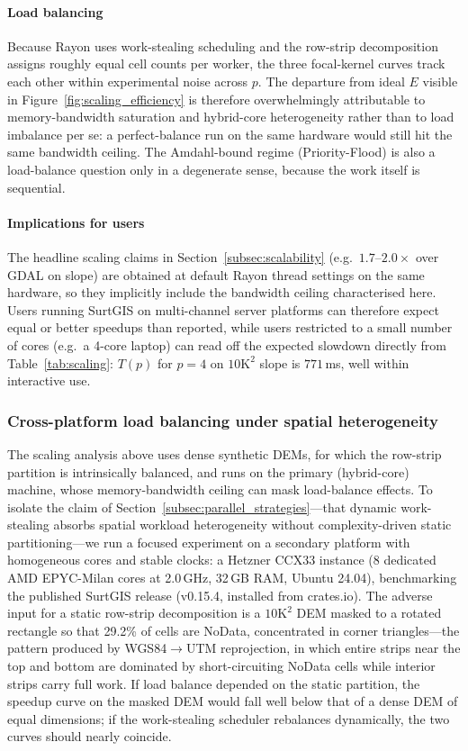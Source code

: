 \documentclass[preprint,review,12pt,authoryear]{elsarticle}
\newif\ifmarkedrev
\newcommand{\revtext}[1]{\ifmarkedrev\textcolor{blue}{#1}\else#1\fi}
\begin{document}
\paragraph{Load balancing} Because Rayon uses work-stealing scheduling \citep{blumofe1999} and the row-strip decomposition assigns roughly equal cell counts per worker, the three focal-kernel curves track each other within experimental noise across $p$. The departure from ideal $E$ visible in Figure~\ref{fig:scaling_efficiency} is therefore overwhelmingly attributable to memory-bandwidth saturation and hybrid-core heterogeneity rather than to load imbalance per se: a perfect-balance run on the same hardware would still hit the same bandwidth ceiling. The Amdahl-bound regime (Priority-Flood) is also a load-balance question only in a degenerate sense, because the work itself is sequential.

\paragraph{Implications for users} The headline scaling claims in Section~\ref{subsec:scalability} (e.g.\ $1.7$--$2.0\times$ over GDAL on slope) are obtained at default Rayon thread settings on the same hardware, so they implicitly include the bandwidth ceiling characterised here. Users running SurtGIS on multi-channel server platforms can therefore expect equal or better speedups than reported, while users restricted to a small number of cores (e.g.\ a 4-core laptop) can read off the expected slowdown directly from Table~\ref{tab:scaling}: $T(p)$ for $p=4$ on $10\text{K}^2$ slope is $771$\,ms, well within interactive use.

\subsubsection{\revtext{Cross-platform load balancing under spatial heterogeneity}}
\label{subsec:nodata_heterogeneity}

\revtext{The scaling analysis above uses dense synthetic DEMs, for which the row-strip partition is intrinsically balanced, and runs on the primary (hybrid-core) machine, whose memory-bandwidth ceiling can mask load-balance effects. To isolate the claim of Section~\ref{subsec:parallel_strategies}---that dynamic work-stealing absorbs spatial workload heterogeneity without complexity-driven static partitioning---we run a focused experiment on a secondary platform with homogeneous cores and stable clocks: a Hetzner CCX33 instance (8 dedicated AMD EPYC-Milan cores at 2.0\,GHz, 32\,GB RAM, Ubuntu 24.04), benchmarking the published SurtGIS release (v0.15.4, installed from crates.io). The adverse input for a static row-strip decomposition is a $10\text{K}^2$ DEM masked to a rotated rectangle so that 29.2\% of cells are NoData, concentrated in corner triangles---the pattern produced by WGS84$\rightarrow$UTM reprojection, in which entire strips near the top and bottom are dominated by short-circuiting NoData cells while interior strips carry full work. If load balance depended on the static partition, the speedup curve on the masked DEM would fall well below that of a dense DEM of equal dimensions; if the work-stealing scheduler rebalances dynamically, the two curves should nearly coincide.}
\end{document}
